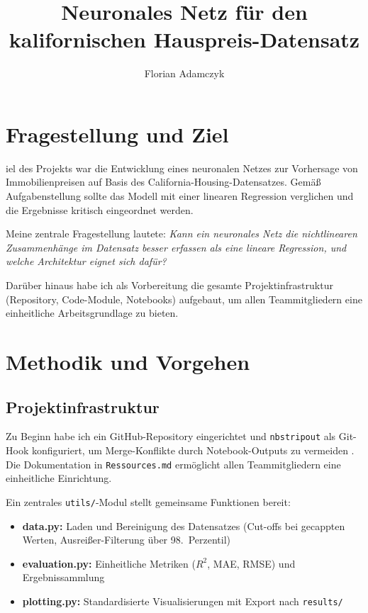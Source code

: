 \documentclass[9pt,a4paper,twocolumn,twoside]{tau-class/tau}
\title{Neuronales Netz f\"ur den kalifornischen Hauspreis-Datensatz}
\author[a]{Florian Adamczyk}
\affil[a]{Justus-Liebig-Universit\"at Gießen, Matrikelnr.\ 8105234}
\begin{document}
\maketitle
\thispagestyle{firststyle}


\section{Fragestellung und Ziel}

iel des Projekts war die Entwicklung eines neuronalen Netzes zur Vorhersage von Immobilienpreisen auf Basis des California-Housing-Datensatzes. Gem\"a{\ss} Aufgabenstellung sollte das Modell mit einer linearen Regression verglichen und die Ergebnisse kritisch eingeordnet werden.

Meine zentrale Fragestellung lautete: \textit{Kann ein neuronales Netz die nichtlinearen Zusammenh\"ange im Datensatz besser erfassen als eine lineare Regression, und welche Architektur eignet sich daf\"ur?}

Dar\"uber hinaus habe ich als Vorbereitung die gesamte Projektinfrastruktur (Repository, Code-Module, Notebooks) aufgebaut, um allen Teammitgliedern eine einheitliche Arbeitsgrundlage zu bieten.


\section{Methodik und Vorgehen}

\subsection{Projektinfrastruktur}

Zu Beginn habe ich ein GitHub-Repository eingerichtet und \texttt{nbstripout} als Git-Hook konfiguriert, um Merge-Konflikte durch Notebook-Outputs zu vermeiden \cite{nbstripout}. Die Dokumentation in \texttt{Ressources.md} erm\"oglicht allen Teammitgliedern eine einheitliche Einrichtung.

Ein zentrales \texttt{utils/}-Modul stellt gemeinsame Funktionen bereit:
\begin{itemize}
    \item \textbf{data.py:} Laden und Bereinigung des Datensatzes (Cut-offs bei gecappten Werten, Ausrei{\ss}er-Filterung \"uber 98.\ Perzentil)
    \item \textbf{evaluation.py:} Einheitliche Metriken ($R^2$, MAE, RMSE) und Ergebnissammlung
    \item \textbf{plotting.py:} Standardisierte Visualisierungen mit Export nach \texttt{results/}
\end{itemize}
\end{document}

